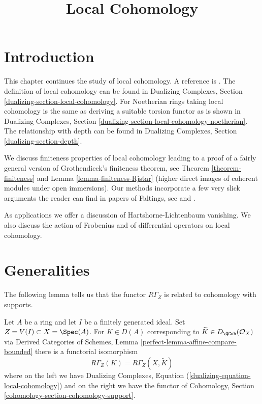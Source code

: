 

%


\title{Local Cohomology}


\maketitle

\label{section-phantom}

\tableofcontents

\section{Introduction}
\label{section-introduction}

\noindent
This chapter continues the study of local cohomology.
A reference is \cite{SGA2}.
The definition of local cohomology can be found in
Dualizing Complexes, Section \ref{dualizing-section-local-cohomology}.
For Noetherian rings taking local cohomology is the same
as deriving a suitable torsion functor as is shown in
Dualizing Complexes, Section
\ref{dualizing-section-local-cohomology-noetherian}.
The relationship with depth can be found in
Dualizing Complexes, Section
\ref{dualizing-section-depth}.

\medskip\noindent
We discuss finiteness properties of local cohomology leading to a proof
of a fairly general version of
Grothendieck's finiteness theorem, see Theorem \ref{theorem-finiteness}
and Lemma \ref{lemma-finiteness-Rjstar} (higher direct images
of coherent modules under open immersions).
Our methods incorporate a few very slick arguments the reader
can find in papers of Faltings, see
\cite{Faltings-annulators} and \cite{Faltings-finiteness}.

\medskip\noindent
As applications we offer a discussion of
Hartshorne-Lichtenbaum vanishing. We also discuss
the action of Frobenius and of differential operators
on local cohomology.




\section{Generalities}
\label{section-generalities}

\noindent
The following lemma tells us that the functor $R\Gamma_Z$
is related to cohomology with supports.

\begin{lemma}
\label{lemma-local-cohomology-is-local-cohomology}
Let $A$ be a ring and let $I$ be a finitely generated ideal.
Set $Z = V(I) \subset X = \Spec(A)$. For $K \in D(A)$ corresponding
to $\widetilde{K} \in D_\QCoh(\mathcal{O}_X)$ via
Derived Categories of Schemes, Lemma \ref{perfect-lemma-affine-compare-bounded}
there is a functorial isomorphism
$$
R\Gamma_Z(K) = R\Gamma_Z(X, \widetilde{K})
$$
where on the left we have
Dualizing Complexes, Equation (\ref{dualizing-equation-local-cohomology})
and on the right we have the functor of
Cohomology, Section \ref{cohomology-section-cohomology-support}.
\end{lemma}

